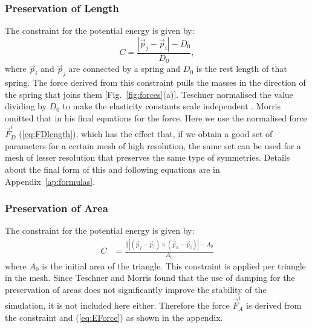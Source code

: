 \documentclass[journal]{IEEEtran}
\newcommand{\eref}[1]{(\ref{#1})}
\newcommand{\fref}[1]{Fig.~\ref{#1}}
\newcommand{\aref}[1]{Appendix~\ref{#1}}
\begin{document}
\subsubsection{Preservation of Length}
The constraint for the potential energy is given by:
\begin{equation}
 C = \dfrac{|\vec{p}_j-\vec{p}_i|-D_0}{D_0}, \label{eq:clength}
\end{equation}
where $\vec{p}_i$ and $\vec{p}_j$ are connected by a spring and $D_0$ is the rest length of that spring.  The force derived from this constraint pulls the masses in the direction of the spring that joins them [\fref{fig:forces}(a)].  Teschner normalised the value dividing by $D_0$ to make the elasticity constants scale independent \cite{Teschner2004}.  Morris \cite{Morris2008} omitted that in his final equations for the force.  Here we use the normalised force $\vec{F}^i_D$ \eref{eq:FDlength}, which has the effect that, if we obtain a good set of parameters for a certain mesh of high resolution, the same set can be used for a mesh of lesser resolution that preserves the same type of symmetries.  Details about the final form of this and following equations are in \aref{ap:formulas}.

\subsubsection{Preservation of Area}
The constraint for the potential energy is given by:
\begin{align}
 C &= \frac{\frac{1}{2}|(\vec{p}_j-\vec{p}_i)\times(\vec{p}_k-\vec{p}_i)|-A_0}{A_0}
\end{align}
where $A_0$ is the initial area of the triangle.  This constraint is applied per triangle in the mesh.  Since Teschner and Morris found that the use of damping for the preservation of areas does not significantly improve the stability of the simulation, it is not included here either.  Therefore the force $\vec{F}^i_A$ is derived from the constraint and \eref{eq:EForce} as shown in the appendix.
\end{document}
